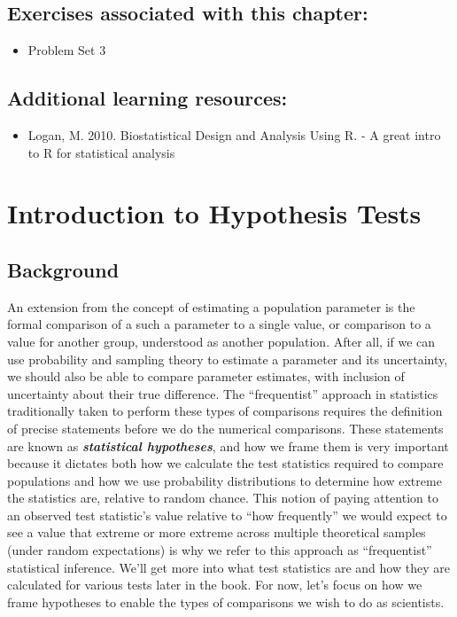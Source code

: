 \documentclass[]{book}
\providecommand{\tightlist}{%
  \setlength{\itemsep}{0pt}\setlength{\parskip}{0pt}}
\begin{document}
\hypertarget{exercises-associated-with-this-chapter-5}{%
\section{Exercises associated with this chapter:}\label{exercises-associated-with-this-chapter-5}}

\begin{itemize}
\tightlist
\item
  Problem Set 3
\end{itemize}

\hypertarget{additional-learning-resources-5}{%
\section{Additional learning resources:}\label{additional-learning-resources-5}}

\begin{itemize}
\tightlist
\item
  Logan, M. 2010. Biostatistical Design and Analysis Using R. - A great intro to R for statistical analysis
\end{itemize}

\hypertarget{introduction-to-hypothesis-tests}{%
\chapter{Introduction to Hypothesis Tests}\label{introduction-to-hypothesis-tests}}

\hypertarget{background-5}{%
\section{Background}\label{background-5}}

An extension from the concept of estimating a population parameter is the formal comparison of a such a parameter to a single value, or comparison to a value for another group, understood as another population. After all, if we can use probability and sampling theory to estimate a parameter and its uncertainty, we should also be able to compare parameter estimates, with inclusion of uncertainty about their true difference. The ``frequentist'' approach in statistics traditionally taken to perform these types of comparisons requires the definition of precise statements before we do the numerical comparisons. These statements are known as \textbf{\emph{statistical hypotheses}}, and how we frame them is very important because it dictates both how we calculate the test statistics required to compare populations and how we use probability distributions to determine how extreme the statistics are, relative to random chance. This notion of paying attention to an observed test statistic's value relative to ``how frequently'' we would expect to see a value that extreme or more extreme across multiple theoretical samples (under random expectations) is why we refer to this approach as ``frequentist'' statistical inference. We'll get more into what test statistics are and how they are calculated for various tests later in the book. For now, let's focus on how we frame hypotheses to enable the types of comparisons we wish to do as scientists.
\end{document}
